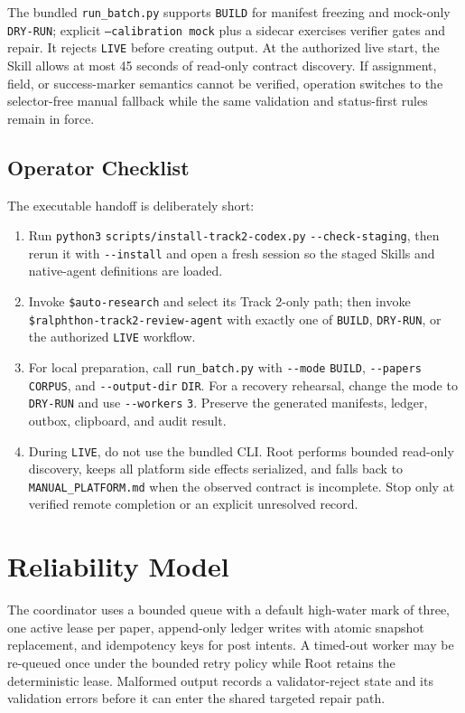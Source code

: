 \documentclass{article}
\begin{document}
The bundled \texttt{run\_batch.py} supports \texttt{BUILD} for manifest
freezing and mock-only \texttt{DRY-RUN}; explicit \texttt{--calibration mock}
plus a sidecar exercises verifier gates and repair. It rejects \texttt{LIVE}
before creating output. At the authorized live start, the Skill
allows at most 45 seconds of read-only contract discovery. If assignment,
field, or success-marker semantics cannot be verified, operation switches to
the selector-free manual fallback while the same validation and status-first
rules remain in force.

\subsection{Operator Checklist}

The executable handoff is deliberately short:
\begin{enumerate}
  \item Run \texttt{python3} \nolinkurl{scripts/install-track2-codex.py}
  \nolinkurl{--check-staging}, then rerun it with \nolinkurl{--install} and
  open a fresh session so the staged Skills and native-agent definitions are
  loaded.
  \item Invoke \texttt{\$auto-research} and select its Track 2-only path; then
  invoke \texttt{\$ralphthon-track2-review-agent} with exactly one of
  \texttt{BUILD}, \texttt{DRY-RUN}, or the authorized \texttt{LIVE} workflow.
  \item For local preparation, call \nolinkurl{run_batch.py} with
  \nolinkurl{--mode} \texttt{BUILD}, \nolinkurl{--papers} \texttt{CORPUS}, and
  \nolinkurl{--output-dir} \texttt{DIR}. For a recovery rehearsal, change the
  mode to \texttt{DRY-RUN} and use \nolinkurl{--workers} \texttt{3}. Preserve
  the generated manifests, ledger, outbox, clipboard, and audit result.
  \item During \texttt{LIVE}, do not use the bundled CLI. Root performs bounded
  read-only discovery, keeps all platform side effects serialized, and falls
  back to \texttt{MANUAL\_PLATFORM.md} when the observed contract is incomplete.
  Stop only at verified remote completion or an explicit unresolved record.
\end{enumerate}

\section{Reliability Model}

The coordinator uses a bounded queue with a default high-water mark of three,
one active lease per paper, append-only ledger writes with atomic snapshot
replacement, and idempotency keys for post intents. A timed-out worker may be
re-queued once under the bounded retry policy while Root retains the
deterministic lease. Malformed output records a validator-reject state and its
validation errors before it can enter the shared targeted repair path.
\end{document}
